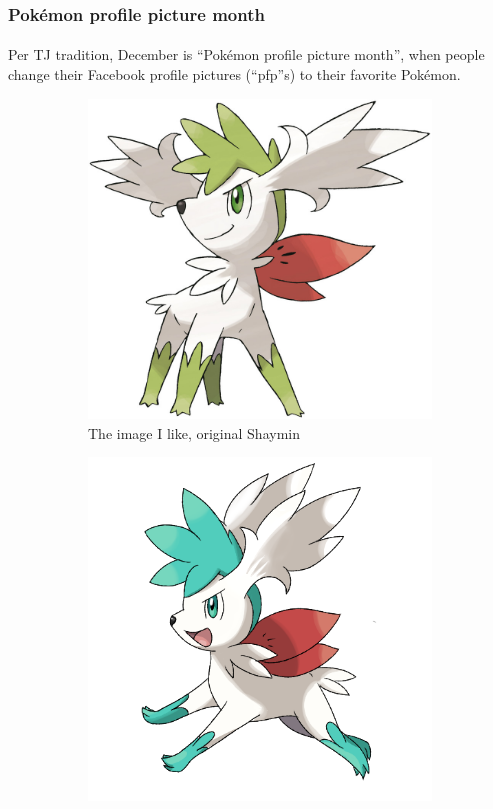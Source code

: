 \documentclass{beamer}                             %
\begin{document}
\begin{frame}
\frametitle{Pokémon profile picture month}
\framesubtitle{}
Per TJ tradition, December is \enquote{Pokémon profile
picture month}, when people change their Facebook profile
pictures (\enquote{pfp}s) to their favorite Pokémon.

\begin{figure}[h!]
    \centering
    \begin{subfigure}[h]{0.32 \textwidth}
      \includegraphics[scale=0.1]{shaymin-sky.jpg}
      \caption{The image I like, original Shaymin}
    \end{subfigure}
    \hfill
    \begin{subfigure}[h]{0.32 \textwidth}
      \includegraphics[scale=1.17]{shaymin-color.png}

\end{subfigure}
\end{figure}
\end{frame}
\end{document}
